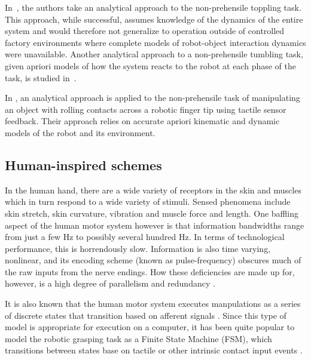 In~\cite{Lynch1999}, the authors take an analytical approach to the non-prehensile toppling task. 
This approach, while successful, assumes knowledge of the dynamics of the entire system and would therefore not generalize to operation outside of controlled factory environments where complete models of robot-object interaction dynamics were unavailable.
Another analytical approach to a non-prehensile tumbling task, given apriori models of how the system reacts to the robot at each phase of the task, is studied in~\cite{sawasaki1989tumbling}.

In \cite{Zhang2012}, an analytical approach is applied to the non-prehensile task of manipulating an object with rolling contacts across a robotic finger tip using tactile sensor feedback.
Their approach relies on accurate apriori kinematic and dynamic models of the robot and its environment.

\subsection{Human-inspired schemes}

In the human hand, there are a wide variety of receptors in the skin and muscles which in turn respond to a wide variety of stimuli.
Sensed phenomena include skin stretch, skin curvature, vibration and muscle force and length.
One baffling aspect of the human motor system however is that information bandwidths range from just a few Hz to possibly several hundred Hz.
In terms of technological performance, this is horrendously slow.
Information is also time varying, nonlinear, and its encoding scheme (known as pulse-frequency) obscures much of the raw inputs from the nerve endings.
How these deficiencies are made up for, however, is a high degree of parallelism and redundancy \cite{howe1993tactile}.

It is also known that the human motor system executes manpulations as a series of discrete states that transition based on afferent signals \cite{Johansson1984}.
Since this type of model is appropriate for execution on a computer, it has been quite popular to model the robotic grasping task as a Finite State Machine (FSM), which transitions between states base on tactile or other intrinsic contact input events \cite{leoni1998implementing, sikka1994tactile}.


